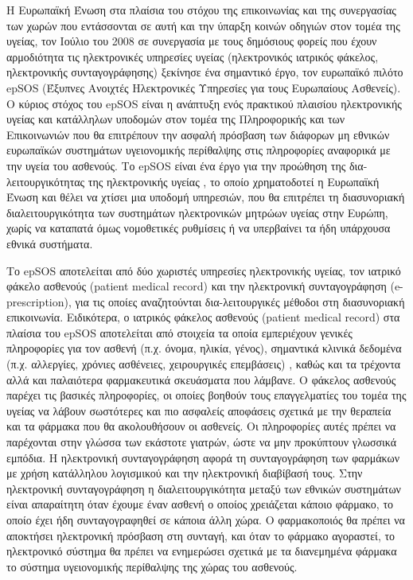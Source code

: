 	 	Η Ευρωπαϊκή Ένωση στα πλαίσια του στόχου της επικοινωνίας και της συνεργασίας των χωρών που εντάσσονται σε αυτή και την ύπαρξη κοινών οδηγιών στον τομέα της υγείας, τον Ιούλιο του 2008 σε συνεργασία με τους δημόσιους φορείς που έχουν αρμοδιότητα τις ηλεκτρονικές υπηρεσίες υγείας (ηλεκτρονικός ιατρικός φάκελος, ηλεκτρονικής συνταγογράφησης) ξεκίνησε ένα σημαντικό έργο, τον ευρωπαϊκό πιλότο epSOS (Έξυπνες Ανοιχτές Ηλεκτρονικές Υπηρεσίες για τους Ευρωπαίους Ασθενείς). Ο κύριος στόχος του epSOS είναι η ανάπτυξη ενός πρακτικού πλαισίου ηλεκτρονικής υγείας και κατάλληλων  υποδομών  στον τομέα της  Πληροφορικής και των Επικοινωνιών που θα επιτρέπουν την ασφαλή πρόσβαση των διάφορων μη εθνικών ευρωπαϊκών συστημάτων υγειονομικής περίθαλψης στις πληροφορίες αναφορικά με την υγεία του ασθενούς. Το epSOS είναι ένα έργο για την προώθηση της δια-λειτουργικότητας της ηλεκτρονικής υγείας , το οποίο χρηματοδοτεί η Ευρωπαϊκή Ένωση και θέλει να χτίσει μια υποδομή υπηρεσιών, που θα επιτρέπει  τη διασυνοριακή διαλειτουργικότητα των συστημάτων ηλεκτρονικών μητρώων υγείας στην Ευρώπη, χωρίς να καταπατά όμως νομοθετικές ρυθμίσεις ή να υπερβαίνει τα ήδη υπάρχουσα εθνικά συστήματα. \cite{Dogac2012}


		Το epSOS αποτελείται από δύο χωριστές υπηρεσίες ηλεκτρονικής υγείας, τον ιατρικό φάκελο ασθενούς (patient medical record) και την ηλεκτρονική συνταγογράφηση (e-prescription),  για τις οποίες αναζητούνται δια-λειτουργικές μέθοδοι στη διασυνοριακή επικοινωνία. Ειδικότερα, ο ιατρικός φάκελος ασθενούς  (patient medical record) στα πλαίσια του epSOS αποτελείται από στοιχεία τα οποία εμπεριέχουν γενικές πληροφορίες για τον ασθενή (π.χ. όνομα, ηλικία, γένος), σημαντικά κλινικά δεδομένα (π.χ. αλλεργίες, χρόνιες ασθένειες, χειρουργικές επεμβάσεις) , καθώς και τα τρέχοντα αλλά και παλαιότερα φαρμακευτικά σκευάσματα που λάμβανε. Ο φάκελος ασθενούς παρέχει τις βασικές πληροφορίες, οι οποίες βοηθούν τους επαγγελματίες του τομέα της υγείας να λάβουν σωστότερες και πιο ασφαλείς αποφάσεις σχετικά με την θεραπεία και τα φάρμακα που θα ακολουθήσουν οι ασθενείς. Οι πληροφορίες αυτές πρέπει να παρέχονται στην γλώσσα των εκάστοτε γιατρών, ώστε να μην προκύπτουν γλωσσικά εμπόδια. Η ηλεκτρονική συνταγογράφηση αφορά τη συνταγογράφηση των φαρμάκων με χρήση κατάλληλου λογισμικού και την ηλεκτρονική διαβίβασή τους. Στην ηλεκτρονική συνταγογράφηση η διαλειτουργικότητα μεταξύ των εθνικών συστημάτων είναι απαραίτητη όταν έχουμε έναν ασθενή ο οποίος χρειάζεται κάποιο φάρμακο, το οποίο έχει ήδη συνταγογραφηθεί σε κάποια άλλη χώρα.  Ο φαρμακοποιός θα πρέπει να αποκτήσει ηλεκτρονική πρόσβαση στη συνταγή, και όταν το φάρμακο αγοραστεί, το ηλεκτρονικό σύστημα θα πρέπει να ενημερώσει σχετικά με τα διανεμημένα φάρμακα το σύστημα υγειονομικής περίθαλψης της χώρας του ασθενούς. \cite{epSOS}
		
